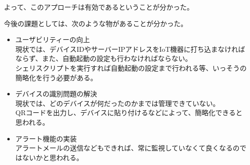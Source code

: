 よって、このアプローチは有効であるということが分かった。


今後の課題としては、次のような物があることが分かった。
\begin{itemize}
	\item ユーザビリティーの向上\\
		現状では、デバイスIDやサーバーIPアドレスをIoT機器に打ち込まなければならず、また、自動起動の設定も行わなければならない。\\
		シェリスクリプトを実行すれば自動起動の設定まで行われる等、いっそうの簡略化を行う必要がある。
	\item デバイスの識別問題の解決\\
		現状では、どのデバイスが何だったのかまでは管理できていない。\\
		QRコードを出力し、デバイスに貼り付けるなどによって、簡略化できると思われる。
	\item アラート機能の実装\\
		アラートメールの送信などもできれば、常に監視していなくて良くなるのではないかと思われる。
\end{itemize}


